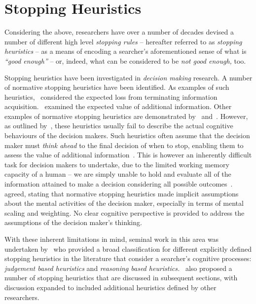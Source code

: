 \section{Stopping Heuristics}\label{sec:stopping_background:heuristics}
Considering the above, researchers have over a number of decades devised a number of different high level \emph{stopping rules} -- hereafter referred to as \emph{stopping heuristics} -- as a means of encoding a searcher's aforementioned sense of what is \emph{``good enough''} -- or, indeed, what can be considered to be \emph{not good enough,} too.

Stopping heuristics have been investigated in \emph{decision making} research. A number of normative stopping heuristics have been identified. As examples of such heuristics,~\cite{busemeyer1988deferred_decision_making} considered the expected loss from terminating information acquisition.~\cite{kogut1990sunk_costs} examined the expected value of additional information. Other examples of normative stopping heuristics are demonstrated by~\cite{pitz1969information_seeking} and~\cite{busemeyer1988deferred_decision_making}. However, as outlined by~\cite{browne2004stopping_rules}, these heuristics usually fail to describe the actual cognitive behaviours of the decision makers. Such heuristics often assume that the decision maker must \emph{think ahead} to the final decision of when to stop, enabling them to assess the value of additional information~\citep{busemeyer1988deferred_decision_making}. This is however an inherently difficult task for decision makers to undertake, due to the limited working memory capacity of a human -- we are simply unable to hold and evaluate all of the information attained to make a decision considering all possible outcomes~\citep{browne2004stopping_rules}.~\cite{nickles1995judgment} agreed, stating that normative stopping heuristics made implicit assumptions about the mental activities of the decision maker, especially in terms of mental scaling and weighting. No clear cognitive perspective is provided to address the assumptions of the decision maker's thinking.

With these inherent limitations in mind, seminal work in this area was undertaken by~\cite{nickles1995judgment} who provided a broad classification for different explicitly defined stopping heuristics in the literature that consider a searcher's cognitive processes: \emph{judgement based heuristics} and \emph{reasoning based heuristics.}~\cite{nickles1995judgment} also proposed a number of stopping heuristics that are discussed in subsequent sections, with discussion expanded to included additional heuristics defined by other researchers.

